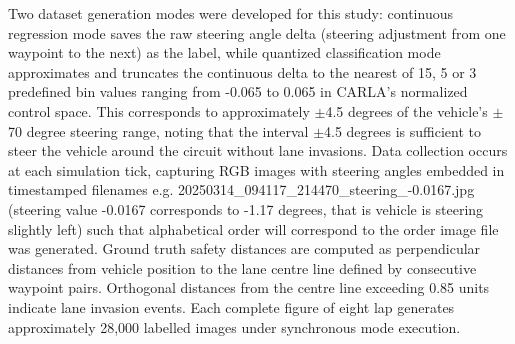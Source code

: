 Two dataset generation modes were developed for this study: continuous regression mode saves the raw steering angle delta (steering adjustment from one waypoint to the next) as the label, while quantized classification mode approximates and truncates the continuous delta to the nearest of 15, 5 or 3 predefined bin values ranging from -0.065 to 0.065 in CARLA's normalized control space. This corresponds to approximately $\pm$4.5 degrees of the vehicle's $\pm$70 degree steering range, noting that the interval $\pm$4.5 degrees is sufficient to steer the vehicle around the circuit without lane invasions.
Data collection occurs at each simulation tick, capturing RGB images with steering angles embedded in timestamped filenames e.g. 20250314\_094117\_214470\_steering\_-0.0167.jpg (steering value -0.0167 corresponds to -1.17 degrees, that is vehicle is steering slightly left) such that alphabetical order will correspond to the order image file was generated. Ground truth safety distances are computed as perpendicular distances from vehicle position to the lane centre line defined by consecutive waypoint pairs. Orthogonal distances from the centre line exceeding 0.85 units indicate lane invasion events. Each complete figure of eight lap generates approximately 28,000 labelled images under synchronous mode execution.

